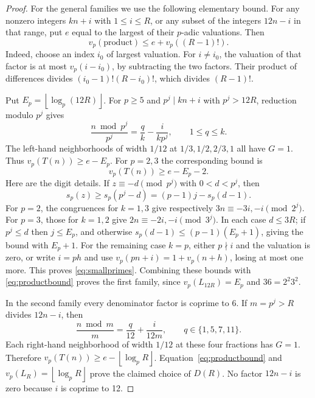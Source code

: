 \documentclass[11pt]{article}
\newcommand{\fl}[1]{\left\lfloor #1\right\rfloor}
\begin{document}
\begin{proof}
For the general families we use the following elementary bound.
For any nonzero integers $kn+i$ with $1\leq i\leq R$, or any subset
of the integers $12n-i$ in that range, put $e$ equal to the largest
of their $p$-adic valuations. Then
\begin{equation}\label{eq:productbound}
 v_p(\text{product})\leq e+v_p((R-1)!).
\end{equation}
Indeed, choose an index $i_0$ of largest valuation. For $i\ne i_0$,
the valuation of that factor is at most $v_p(i-i_0)$, by subtracting
the two factors. Their product of differences divides
$(i_0-1)!(R-i_0)!$, which divides $(R-1)!$.

Put $E_p=\fl{\log_p(12R)}$. For $p\geq5$ and
$p^j\mid kn+i$ with $p^j>12R$, reduction modulo $p^j$ gives
\[
 \frac{n\bmod p^j}{p^j}=\frac{q}{k}-\frac{i}{kp^j},
 \qquad 1\leq q\leq k.
\]
The left-hand neighborhoods of width $1/12$ at
$1/3,1/2,2/3,1$ all have $G=1$. Thus $v_p(T(n))\geq e-E_p$.
For $p=2,3$ the corresponding bound is
\begin{equation}\label{eq:smallprimes}
 v_p(T(n))\geq e-E_p-2.
\end{equation}
Here are the digit details. If $z\equiv-d\pmod{p^j}$ with
$0<d<p^j$, then
\[
 s_p(z)\geq s_p(p^j-d)=(p-1)j-s_p(d-1).
\]
For $p=2$, the congruences for $k=1,3$ give respectively
$3n\equiv-3i,-i\pmod{2^j}$. For $p=3$, those for $k=1,2$
give $2n\equiv-2i,-i\pmod{3^j}$. In each case $d\leq3R$;
if $p^j\leq d$ then $j\leq E_p$, and otherwise
$s_p(d-1)\leq(p-1)(E_p+1)$, giving the bound with $E_p+1$.
For the remaining case $k=p$, either $p\nmid i$ and the valuation
is zero, or write $i=ph$ and use
$v_p(pn+i)=1+v_p(n+h)$, losing at most one more.
This proves \eqref{eq:smallprimes}.
Combining these bounds with \eqref{eq:productbound} proves the
first family, since $v_p(L_{12R})=E_p$ and $36=2^2 3^2$.

In the second family every denominator factor is coprime to 6.
If $m=p^j>R$ divides $12n-i$, then
\[
 \frac{n\bmod m}{m}=\frac{q}{12}+\frac{i}{12m},
 \qquad q\in\{1,5,7,11\}.
\]
Each right-hand neighborhood of width $1/12$ at these four
fractions has $G=1$. Therefore $v_p(T(n))\geq
e-\fl{\log_p R}$. Equation~\eqref{eq:productbound} and
$v_p(L_R)=\fl{\log_p R}$ prove the claimed choice of $D(R)$.
No factor $12n-i$ is zero because $i$ is coprime to 12.
\end{proof}
\end{document}
